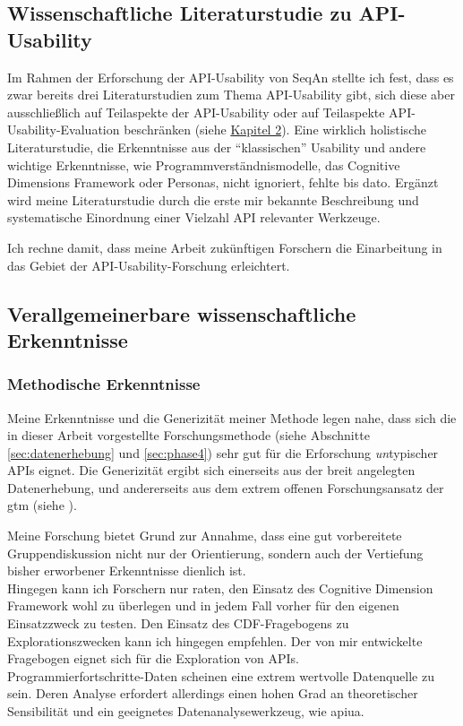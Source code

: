\subsection{Wissenschaftliche Literaturstudie zu API-Usability}
Im Rahmen der Erforschung der API-Usability von SeqAn stellte ich fest, dass es zwar bereits drei Literaturstudien zum Thema API-Usability gibt, sich diese aber ausschließlich auf Teilaspekte der API-Usability oder auf Teilaspekte API-Usability-Evaluation beschränken (siehe \href{sec:forschungsstand}{Kapitel 2}). Eine wirklich holistische Literaturstudie, die Erkenntnisse aus der ``klassischen'' Usability und andere wichtige Erkenntnisse, wie Programmverständnismodelle, das Cognitive Dimensions Framework oder Personas, nicht ignoriert, fehlte bis dato. Ergänzt wird meine Literaturstudie durch die erste mir bekannte Beschreibung und systematische Einordnung einer Vielzahl API relevanter Werkzeuge.

Ich rechne damit, dass meine Arbeit zukünftigen Forschern die Einarbeitung in das Gebiet der API-Usability-Forschung erleichtert.


\subsection{Verallgemeinerbare wissenschaftliche Erkenntnisse}

\subsubsection{Methodische Erkenntnisse}
Meine Erkenntnisse und die Generizität meiner Methode legen nahe, dass sich die in dieser Arbeit vorgestellte Forschungsmethode (siehe Abschnitte \ref{sec:datenerhebung} und \ref{sec:phase4}) sehr gut für die Erforschung \textit{un}typischer APIs eignet. Die Generizität ergibt sich einerseits aus der breit angelegten Datenerhebung, und andererseits aus dem extrem offenen Forschungsansatz der \gls{gtm} (siehe ).

Meine Forschung bietet Grund zur Annahme, dass eine gut vorbereitete Gruppendiskussion nicht nur der Orientierung, sondern auch der Vertiefung bisher erworbener Erkenntnisse dienlich ist.
\\Hingegen kann ich Forschern nur raten, den Einsatz des Cognitive Dimension Framework wohl zu überlegen und in jedem Fall vorher für den eigenen Einsatzzweck zu testen. Den Einsatz des CDF-Fragebogens zu Explorationszwecken kann ich hingegen empfehlen. Der von mir entwickelte Fragebogen eignet sich für die Exploration von APIs.
\\Programmierfortschritte-Daten scheinen eine extrem wertvolle Datenquelle zu sein. Deren Analyse erfordert allerdings einen hohen Grad an theoretischer Sensibilität und ein geeignetes Datenanalysewerkzeug, wie \gls{apiua}.

